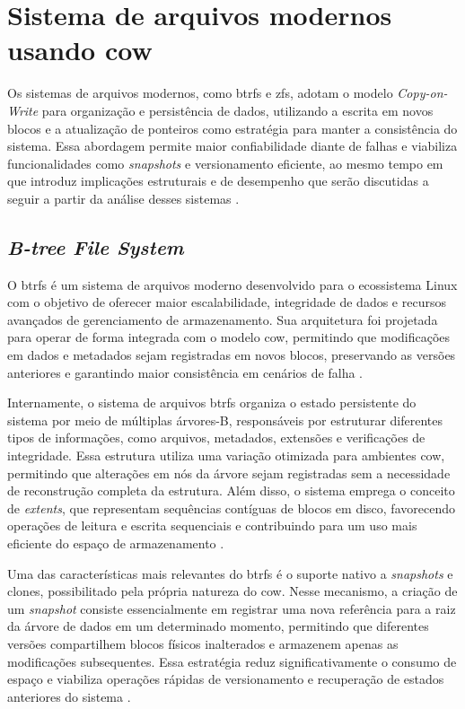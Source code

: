 \section{Sistema de arquivos modernos usando \gls{cow}}

Os sistemas de arquivos modernos, como \gls{btrfs} e \gls{zfs}, adotam o modelo \textit{Copy-on-Write} para organização e persistência de dados, utilizando a escrita em novos blocos e a atualização de ponteiros como estratégia para manter a consistência do sistema. Essa abordagem permite maior confiabilidade diante de falhas e viabiliza funcionalidades como \textit{snapshots} e versionamento eficiente, ao mesmo tempo em que introduz implicações estruturais e de desempenho que serão discutidas a seguir a partir da análise desses sistemas \cite{Benites2025}.

\subsection{\textit{B-tree File System}}

O \gls{btrfs} é um sistema de arquivos moderno desenvolvido para o ecossistema Linux com o objetivo de oferecer maior escalabilidade, integridade de dados e recursos avançados de gerenciamento de armazenamento. Sua arquitetura foi projetada para operar de forma integrada com o modelo \gls{cow}, permitindo que modificações em dados e metadados sejam registradas em novos blocos, preservando as versões anteriores e garantindo maior consistência em cenários de falha \cite{Benites2025}.

Internamente, o sistema de arquivos \gls{btrfs} organiza o estado persistente do sistema por meio de múltiplas árvores-B, responsáveis por estruturar diferentes tipos de informações, como arquivos, metadados, extensões e verificações de integridade. Essa estrutura utiliza uma variação otimizada para ambientes \gls{cow}, permitindo que alterações em nós da árvore sejam registradas sem a necessidade de reconstrução completa da estrutura. Além disso, o sistema emprega o conceito de \textit{extents}, que representam sequências contíguas de blocos em disco, favorecendo operações de leitura e escrita sequenciais e contribuindo para um uso mais eficiente do espaço de armazenamento \cite{Benites2025}.

Uma das características mais relevantes do \gls{btrfs} é o suporte nativo a \textit{snapshots} e clones, possibilitado pela própria natureza do \gls{cow}. Nesse mecanismo, a criação de um \textit{snapshot} consiste essencialmente em registrar uma nova referência para a raiz da árvore de dados em um determinado momento, permitindo que diferentes versões compartilhem blocos físicos inalterados e armazenem apenas as modificações subsequentes. Essa estratégia reduz significativamente o consumo de espaço e viabiliza operações rápidas de versionamento e recuperação de estados anteriores do sistema \cite{Chen2014}.

